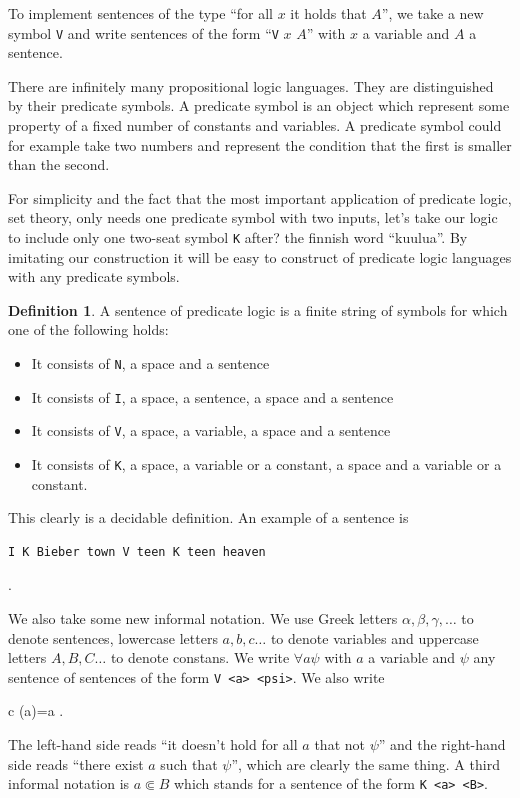 \documentclass[11pt,oneside,%
]{memoir}
\newenvironment{eqna}{\begin{IEEEeqnarray}{c}}{\end{IEEEeqnarray}\ignorespacesafterend}
\theoremstyle{definition}
\newtheorem{maaritelma}{Definition}
\newcommand{\joukk}{\lstinline[language=joukko]}
\begin{document}
To implement sentences of the type ``for all \(x\) it holds that \(A\)'', we take a new symbol \joukk!V! and write sentences of the form ``\joukk!V! \(x\) \(A\)'' with \(x\) a variable and \(A\) a sentence.

There are infinitely many propositional logic languages. They are distinguished by their predicate symbols. A predicate symbol is an object which represent some property of a fixed number of constants and variables. A predicate symbol could for example take two numbers and represent the condition that the first is smaller than the second.

For simplicity and the fact that the most important application of predicate logic, set theory, only needs one predicate symbol with two inputs, let's take our logic to include only one two-seat symbol \joukk!K! after? the finnish word ``kuulua''. By imitating our construction it will be easy to construct of predicate logic languages with any predicate symbols.

\begin{maaritelma}
A sentence of predicate logic is a finite string of symbols for which one of the following holds:
\begin{itemize}
    \item It consists of \joukk!N!, a space and a sentence
    \item It consists of \joukk!I!, a space, a sentence, a space and a sentence
    \item It consists of \joukk!V!, a space, a variable, a space and a sentence
    \item It consists of \joukk!K!, a space, a variable or a constant, a space and a variable or a constant.
\end{itemize}
\end{maaritelma}
This clearly is a decidable definition. An example of a sentence is
\begin{lstlisting}[language=joukko]
I K Bieber town V teen K teen heaven
\end{lstlisting}
.

We also take some new informal notation. We use Greek letters \(\alpha,\beta,\gamma,\dotsc\) to denote sentences, lowercase letters \(a,b,c\dotsc\) to denote variables and uppercase letters \(A,B,C\dotsc\) to denote constans. We write \(\forall a \psi\) with \(a\) a variable and \(\psi\) any sentence of sentences of the form \joukk!V <a> <psi>!. We also write
\begin{eqna}
    \neg(\forall a\neg \psi)=\exists a \psi.
\end{eqna}
The left-hand side reads ``it doesn't hold for all \(a\) that not \(\psi\)'' and the right-hand side reads ``there exist \(a\) such that \(\psi\)'', which are clearly the same thing. A third informal notation is \(a\Subset B\) which stands for a sentence of the form \joukk!K <a> <B>!.
\end{document}
